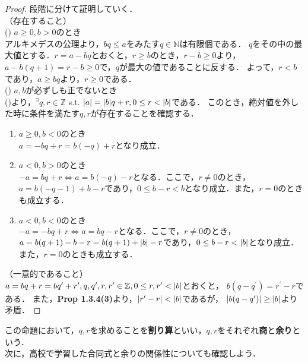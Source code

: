 \documentclass{jsarticle}
\DeclarePairedDelimiter{\abs}{\lvert}{\rvert} %
\newcommand{\integer}{\mathbb{Z}}
\newcommand{\nat}{\mathbb{N}}
\begin{document}
    \begin{proof}
      段階に分けて証明していく． \\
      （存在すること） \\
      () $a \geq 0, b > 0$のとき \\
      アルキメデスの公理より，$bq \leq a$をみたす$q \in \nat$は有限個である．
      $q$をその中の最大値とする．$r = a-bq$とおくと，$r \geq b$のとき，$r-b \geq 0$より，
      $a-b(q+1) = r - b \geq 0$で，$q$が最大の値であることに反する．
      よって，$r < b$であり，$a \geq bq$より，$r \geq 0$である．\\
      () $a,b$が必ずしも正でないとき \\
      ()より，$^{\exists}q,r \in \integer$ s.t. $\abs{a} = \abs{b}q + r, 0 \leq r < \abs{b}$である．
      このとき，絶対値を外した時に条件を満たす$q,r$が存在することを確認する．
      \begin{enumerate}
        \item $a \geq 0, b < 0$のとき\\
        $a = -bq + r = b(-q) + r$となり成立．
        \item $a < 0, b > 0$のとき\\
        $-a = bq + r \iff a = b(-q)-r$となる．ここで，$r \neq 0$のとき，
        $a = b(-q-1) + b-r$であり，$0 \leq b-r < b$となり成立．また，$r = 0$のときも成立する．
        \item $a < 0, b < 0のとき$\\
        $-a = -bq + r \iff a = bq - r$となる．ここで，$r \neq 0$のとき，
        $a = b(q+1)-b-r = b(q+1) + \abs{b} - r$であり，$0 \leq b-r < \abs{b}$となり成立．また，$r = 0$のときも成立する．
      \end{enumerate}
      （一意的であること）\\
      $a = bq + r = bq^{\prime}+r^{\prime}, q, q^{\prime}, r, r^{\prime} \in \integer, 0 \leq r, r^{\prime} < \abs{b}$とおくと，
      $b(q-q^{\prime}) = r^{\prime} - r$である．
      また，\textbf{Prop 1.3.4(3)}より，$\abs{r^{\prime} - r} < \abs{b}$であるが，
      $\abs{b(q-q^{\prime})} \geq \abs{b}$より矛盾．
    \end{proof}

    この命題において，$q,r$を求めることを\textbf{割り算}といい，$q,r$をそれぞれ\textbf{商}と\textbf{余り}という．\\
    次に，高校で学習した合同式と余りの関係性についても確認しよう．
\end{document}
